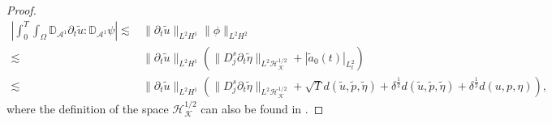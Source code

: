 \documentclass[letterpaper,reqno,10pt,twoside]{amsart}
\theoremstyle{definition}
\theoremstyle{remark}
\def\p{\partial}
\def\Om{\Omega}
\begin{document}
\begin{proof}
			\begin{equation}
				\begin{aligned}
					\left|\int_0^T\int_\Om \mathbb{D}_{\mathcal{A}^1}\p_t\tilde{u}:\mathbb{D}_{\mathcal{A}^1}\psi\right| \lesssim &\|\p_t\tilde{u}\|_{L^2 H^1}\|\phi\|_{L^2H^2} \\\lesssim& \|\p_t\tilde{u}\|_{L^2 H^1}(\|D_j^s\p_t\tilde{\eta}\|_{L^2\mathcal{H}_{\mathcal{K}}^{1/2}}+|\tilde{a}_{0}(t)|_{L_{t}^{2}})\\
					\lesssim&\|\p_t\tilde{u}\|_{L^2 H^1}(\|D_j^s\p_t\tilde{\eta}\|_{L^2\mathcal{H}_{\mathcal{K}}^{1/2}}+\sqrt{T}d(\tilde{u},\tilde{p},\tilde{\eta})+\delta^{\frac{1}{2}} d(\tilde{u},\tilde{p},\tilde{\eta})+\delta^{\frac{1}{2}} d({u},{p},{\eta})),
				\end{aligned}
			\end{equation}
			where the definition of the space $\mathcal{H}_{\mathcal{K}}^{1/2}$ can also be found in \cite[Section 8]{GT2020}.
			

\end{proof}
\end{document}
